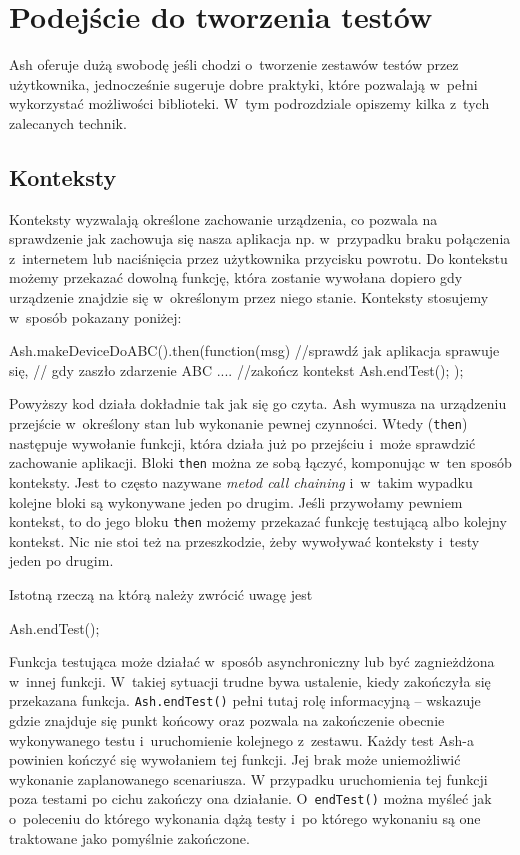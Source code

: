 \documentclass[brudnopis]{xmgr}
\begin{document}
\section{Podejście do tworzenia testów}

Ash oferuje dużą swobodę jeśli chodzi o~tworzenie zestawów testów przez użytkownika, jednocześnie sugeruje dobre praktyki, które pozwalają w~pełni wykorzystać możliwości biblioteki. W~tym podrozdziale opiszemy kilka z~tych zalecanych technik.    

\subsection{Konteksty}

Konteksty wyzwalają określone zachowanie urządzenia, co pozwala na sprawdzenie jak zachowuja się nasza aplikacja np. w~przypadku braku połączenia z~internetem lub naciśnięcia przez użytkownika przycisku powrotu. Do kontekstu możemy przekazać dowolną funkcję, która zostanie wywołana dopiero gdy urządzenie znajdzie się w~określonym przez niego stanie. Konteksty stosujemy w~sposób pokazany poniżej:

\begin{javascriptcode}
  Ash.makeDeviceDoABC().then(function(msg){
      //sprawdź jak aplikacja sprawuje się, 
      //  gdy zaszło zdarzenie ABC
      ....
      //zakończ kontekst
      Ash.endTest();
  });
\end{javascriptcode}

Powyższy kod działa dokładnie tak jak się go czyta. Ash wymusza na urządzeniu przejście w~określony stan lub wykonanie pewnej czynności. Wtedy (\texttt{then}) następuje wywołanie funkcji, która działa już po przejściu i~może sprawdzić zachowanie aplikacji. Bloki \texttt{then} można ze sobą łączyć, komponując w~ten sposób konteksty. Jest to często nazywane \textit{metod call chaining} i~w~takim wypadku kolejne bloki są wykonywane jeden po drugim. Jeśli przywołamy pewniem kontekst, to do jego bloku \texttt{then} możemy przekazać funkcję testującą albo kolejny kontekst. Nic nie stoi też na przeszkodzie, żeby wywoływać konteksty i~testy jeden po drugim. 

Istotną rzeczą na którą należy zwrócić uwagę jest 

\begin{javascriptcode}
   Ash.endTest();
\end{javascriptcode}

Funkcja testująca może działać w~sposób asynchroniczny lub być zagnieżdżona w~innej funkcji. W~takiej sytuacji trudne bywa ustalenie, kiedy zakończyła się przekazana funkcja. \texttt{Ash.endTest()} pełni tutaj rolę informacyjną -- wskazuje gdzie znajduje się punkt końcowy oraz pozwala na zakończenie obecnie wykonywanego testu i~uruchomienie kolejnego z~zestawu. Każdy test Ash-a powinien kończyć się wywołaniem tej funkcji. Jej brak może uniemożliwić wykonanie zaplanowanego scenariusza. W przypadku uruchomienia tej funkcji poza testami po cichu zakończy ona działanie. O~\texttt{endTest()} można myśleć jak o~poleceniu do którego wykonania dążą testy i~po którego wykonaniu są one traktowane jako pomyślnie zakończone. 
\end{document}
